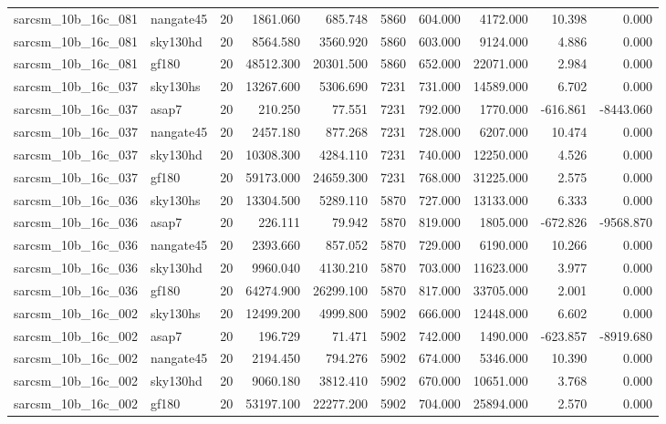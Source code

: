 \documentclass{article}
\begin{document}
\begin{longtable}{llrrrrrrrr}
sarcsm\_10b\_16c\_081 & nangate45 & 20 & 1861.060 & 685.748 & 5860 & 604.000 & 4172.000 & 10.398 & 0.000 \\
sarcsm\_10b\_16c\_081 & sky130hd & 20 & 8564.580 & 3560.920 & 5860 & 603.000 & 9124.000 & 4.886 & 0.000 \\
sarcsm\_10b\_16c\_081 & gf180 & 20 & 48512.300 & 20301.500 & 5860 & 652.000 & 22071.000 & 2.984 & 0.000 \\
sarcsm\_10b\_16c\_037 & sky130hs & 20 & 13267.600 & 5306.690 & 7231 & 731.000 & 14589.000 & 6.702 & 0.000 \\
sarcsm\_10b\_16c\_037 & asap7 & 20 & 210.250 & 77.551 & 7231 & 792.000 & 1770.000 & -616.861 & -8443.060 \\
sarcsm\_10b\_16c\_037 & nangate45 & 20 & 2457.180 & 877.268 & 7231 & 728.000 & 6207.000 & 10.474 & 0.000 \\
sarcsm\_10b\_16c\_037 & sky130hd & 20 & 10308.300 & 4284.110 & 7231 & 740.000 & 12250.000 & 4.526 & 0.000 \\
sarcsm\_10b\_16c\_037 & gf180 & 20 & 59173.000 & 24659.300 & 7231 & 768.000 & 31225.000 & 2.575 & 0.000 \\
sarcsm\_10b\_16c\_036 & sky130hs & 20 & 13304.500 & 5289.110 & 5870 & 727.000 & 13133.000 & 6.333 & 0.000 \\
sarcsm\_10b\_16c\_036 & asap7 & 20 & 226.111 & 79.942 & 5870 & 819.000 & 1805.000 & -672.826 & -9568.870 \\
sarcsm\_10b\_16c\_036 & nangate45 & 20 & 2393.660 & 857.052 & 5870 & 729.000 & 6190.000 & 10.266 & 0.000 \\
sarcsm\_10b\_16c\_036 & sky130hd & 20 & 9960.040 & 4130.210 & 5870 & 703.000 & 11623.000 & 3.977 & 0.000 \\
sarcsm\_10b\_16c\_036 & gf180 & 20 & 64274.900 & 26299.100 & 5870 & 817.000 & 33705.000 & 2.001 & 0.000 \\
sarcsm\_10b\_16c\_002 & sky130hs & 20 & 12499.200 & 4999.800 & 5902 & 666.000 & 12448.000 & 6.602 & 0.000 \\
sarcsm\_10b\_16c\_002 & asap7 & 20 & 196.729 & 71.471 & 5902 & 742.000 & 1490.000 & -623.857 & -8919.680 \\
sarcsm\_10b\_16c\_002 & nangate45 & 20 & 2194.450 & 794.276 & 5902 & 674.000 & 5346.000 & 10.390 & 0.000 \\
sarcsm\_10b\_16c\_002 & sky130hd & 20 & 9060.180 & 3812.410 & 5902 & 670.000 & 10651.000 & 3.768 & 0.000 \\
sarcsm\_10b\_16c\_002 & gf180 & 20 & 53197.100 & 22277.200 & 5902 & 704.000 & 25894.000 & 2.570 & 0.000 \\

\end{longtable}
\end{document}

